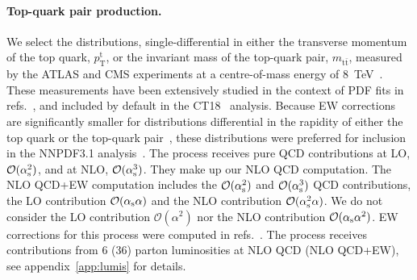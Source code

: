 \paragraph{Top-quark pair production.}
We select the distributions, single-differential in either the transverse
momentum of the top quark, $p_\mathrm{T}^\mathrm{t}$, or the invariant mass of the top-quark
pair, $m_{\mathrm{t}\bar{\mathrm{t}}}$, measured by the ATLAS and CMS experiments at a centre-of-mass
energy of \SI{8}{\tera\electronvolt}~\cite{Aad:2015mbv,Khachatryan:2015oqa}. These measurements have
been extensively studied in the context of PDF fits in
refs.~\cite{Czakon:2016olj,Bailey:2019yze,Amoroso:2020lgh,Kadir:2020yml}, and
included by default in the CT18~\cite{Hou:2019efy} analysis.
Because EW corrections are significantly smaller for distributions differential
in the rapidity of either the top quark or the top-quark
pair~\cite{Czakon:2017wor}, these distributions were preferred for inclusion
in the NNPDF3.1 analysis~\cite{Ball:2017nwa}. The process receives
pure QCD contributions at LO, $\mathcal{O}(\alpha_\mathrm{s}^2)$, and
at NLO, $\mathcal{O}(\alpha_\mathrm{s}^3)$. They make up our NLO QCD
computation. The NLO QCD+EW computation includes the $\mathcal{O}(\alpha_\mathrm{s}^2)$
and $\mathcal{O}(\alpha_\mathrm{s}^3)$ QCD contributions, the LO contribution
$\mathcal{O}(\alpha_\mathrm{s}\alpha)$ and the NLO contribution
$\mathcal{O}(\alpha_\mathrm{s}^2\alpha)$.
We do not consider the LO contribution $\mathcal{O}(\alpha^2)$ nor the
NLO contribution $\mathcal{O}(\alpha_\mathrm{s}\alpha^2)$.
EW corrections for this process
were computed in refs.~\cite{Bernreuther:2010ny,Hollik:2011ps,Kuhn:2011ri,Bernreuther:2012sx,Pagani:2016caq,Czakon:2017wor,Czakon:2017lgo,Czakon:2017mmr,Czakon:2019bcq,Czakon:2019txp}. The process receives contributions from
6 (36) parton luminosities at NLO QCD (NLO QCD+EW),
see appendix~\ref{app:lumis} for details.

